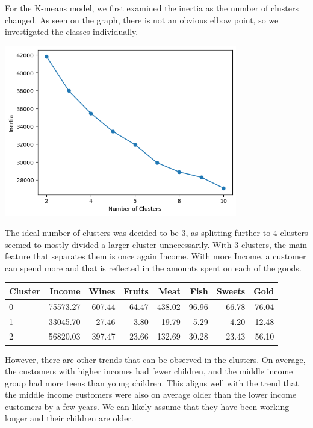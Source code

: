 \documentclass[12pt]{article}
\begin{document}
For the K-means model, we first examined the inertia as the number of clusters changed. As seen on the graph, there is not an obvious elbow point, so we investigated the classes individually. 
\begin{center}
    \includegraphics[width=4in]{images/inertia.png}
\end{center}
The ideal number of clusters was decided to be 3, as splitting further to 4 clusters seemed to mostly divided a larger cluster unnecessarily. With 3 clusters, the main feature that separates them is once again Income. With more Income, a customer can spend more and that is reflected in the amounts spent on each of the goods. 
\begin{center}
    \begin{tabular}{lrrrrrrr}
    \toprule
    Cluster &   Income &  Wines &  Fruits &  Meat &  Fish &  Sweets &  Gold \\
    \midrule
    0 & 75573.27 &    607.44 &      64.47 &           438.02 &            96.96 &             66.78 &         76.04 \\
    1 & 33045.70 &     27.46 &       3.80 &            19.79 &             5.29 &              4.20 &         12.48 \\
    2 & 56820.03 &    397.47 &      23.66 &           132.69 &            30.28 &             23.43 &         56.10 \\
    \bottomrule
    \end{tabular}
\end{center}
However, there are other trends that can be observed in the clusters. On average, the customers with higher incomes had fewer children, and the middle income group had more teens than young children. This aligns well with the trend that the middle income customers were also on average older than the lower income customers by a few years. We can likely assume that they have been working longer and their children are older. 
\end{document}

